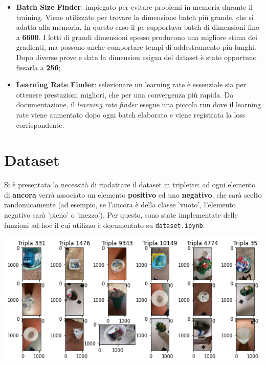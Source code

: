 \documentclass[11pt]{article}
\begin{document}
\begin{itemize}
    \item {\textbf{Batch Size Finder}: 
        impiegato per evitare problemi in memoria durante il training. Viene utilizzato
        per trovare la dimensione batch più grande, che si adatta alla memoria. In questo caso il pc supportava batch di dimensioni fino a \textbf{6600}. I lotti di grandi
        dimensioni spesso producono una migliore stima dei gradienti,
        ma possono anche comportare tempi di addestramento più lunghi. Dopo diverse prove e data la dimension esigua del dataset è stato
        opportuno fissarla a \textbf{256}; 
    }
    \item {\textbf{Learning Rate Finder}: selezionare un learning rate è essenziale sia per ottenere
        prestazioni migliori, che per una convergenza più rapida. Da documentazione,
        il \textit{learning rate finder} esegue una piccola run dove il learning rate viene aumentato dopo ogni batch elaborato
        e viene registrata la loss corrispondente.
    }
\end{itemize}

\section{Dataset}

Si è presentata la necessità di riadattare il dataset in triplette: ad ogni elemento di \textbf{ancora} verrà
associato un elemento \textbf{positivo} ed uno \textbf{negativo}, che sarà scelto randomicamente 
(ad esempio, se l'ancora è della classe 'vuoto', l'elemento negativo sarà 'pieno' o 'mezzo'). Per
questo, sono state implementate delle funzioni ad-hoc il cui utilizzo è documentato su \texttt{dataset.ipynb}. 

\begin{center}
    \begin{minipage}{0.6\linewidth}
    \includegraphics[width=\linewidth]{triplet_dataset.png}
    \end{minipage}
\end{center}
\end{document}
